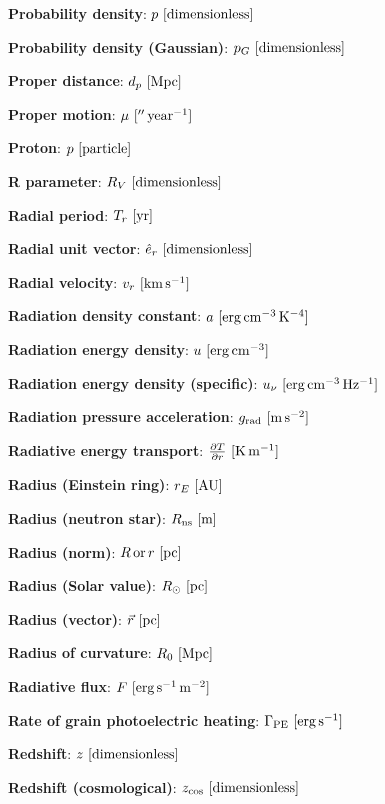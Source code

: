 \documentclass[a4paper,10pt]{article}
\begin{document}
{\noindent}\textbf{Probability density}: $p ~ [{\rm dimensionless}]$

{\noindent}\textbf{Probability density (Gaussian)}: $p_G ~ [{\rm dimensionless}]$

{\noindent}\textbf{Proper distance}: $d_p ~ [{\rm Mpc}]$

{\noindent}\textbf{Proper motion}: $\mu ~ [{\rm ''\,year^{-1}}]$

{\noindent}\textbf{Proton}: $p ~ [{\rm particle}]$

{\noindent}\textbf{R parameter}: $R_V ~ [{\rm dimensionless}]$

{\noindent}\textbf{Radial period}: $T_r ~ [{\rm yr}]$

{\noindent}\textbf{Radial unit vector}: $\hat{e}_r ~ [{\rm dimensionless}]$

{\noindent}\textbf{Radial velocity}: $v_r ~ [{\rm km\,s^{-1}}]$

{\noindent}\textbf{Radiation density constant}: $a ~ [{\rm erg\,cm^{-3}\,K^{-4}}]$

{\noindent}\textbf{Radiation energy density}: $u ~ [{\rm erg\,cm^{-3}}]$

{\noindent}\textbf{Radiation energy density (specific)}: $u_\nu ~
[{\rm erg\,cm^{-3}\,Hz^{-1}}]$

{\noindent}\textbf{Radiation pressure acceleration}: $g_{\rm rad} ~ [{\rm m\,s^{-2}}]$

{\noindent}\textbf{Radiative energy transport}: $\frac{\partial T}{\partial r} ~ [{\rm K\,m^{-1}}]$

{\noindent}\textbf{Radius (Einstein ring)}: $r_E ~ [{\rm AU}]$

{\noindent}\textbf{Radius (neutron star)}: $R_{\rm ns} ~ [{\rm m}]$

{\noindent}\textbf{Radius (norm)}: $R\,{\rm or}\,r ~ [{\rm pc}]$

{\noindent}\textbf{Radius (Solar value)}: $R_\odot ~ [{\rm pc}]$

{\noindent}\textbf{Radius (vector)}: $\vec{r} ~ [{\rm pc}]$

{\noindent}\textbf{Radius of curvature}: $R_0 ~ [{\rm Mpc}]$

{\noindent}\textbf{Radiative flux}: $F ~ [{\rm erg\,s^{-1}\,m^{-2}}]$

{\noindent}\textbf{Rate of grain photoelectric heating}: $\Gamma_{\rm PE} ~ [{\rm erg\,s^{-1}}]$

{\noindent}\textbf{Redshift}: $z ~ [{\rm dimensionless}]$

{\noindent}\textbf{Redshift (cosmological)}: $z_\mathrm{cos} ~ [{\rm dimensionless}]$
\end{document}
